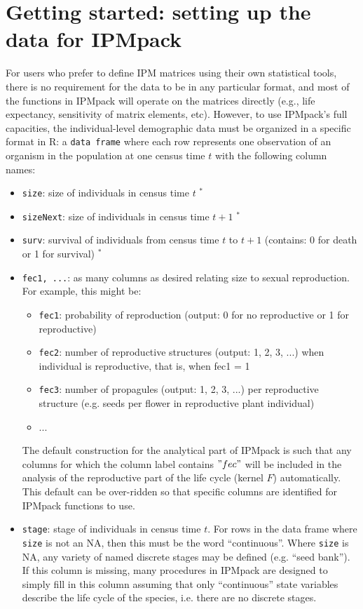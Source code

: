 \documentclass{article}
\begin{document}
\section{Getting started: setting up the data for IPMpack}
For users who prefer to define IPM matrices using their own
statistical tools, there is no requirement for the data to be in any
particular format, and most of the functions in IPMpack will operate
on the matrices directly (e.g., life expectancy, sensitivity of matrix
elements, etc).  However, to use IPMpack's full capacities, the
individual-level demographic data must be organized in a specific
format in R: a {\tt data frame} where each row represents one observation of an organism in the population at one census time $t$ with the following column names:  
\begin{itemize}
\item  {\tt size}: size of individuals in census time $t$  $^*$
\item  {\tt sizeNext}: size of individuals in census time $t+1$  $^*$
\item  {\tt surv}: survival of individuals from census time $t$ to  $t+1$ (contains: 0 for death or 1 for survival) $^*$
\item  {\tt fec1, ...}: as many columns as desired relating size to sexual reproduction. For example, this might be: 
  \begin{itemize}
  \item {\tt fec1}: probability of reproduction (output: 0 for no reproductive or 1 for reproductive)
  \item {\tt fec2}: number of reproductive structures (output: 1, 2, 3, $...$) when individual is reproductive, that is, when fec1 = 1
  \item {\tt fec3}: number of propagules (output: 1, 2, 3, $...$) per reproductive structure (e.g. seeds per flower in reproductive plant individual)
  \item ...
  \end{itemize}
  The default construction for the analytical part of IPMpack is such that any columns for which the column label contains $"fec"$ will be included in the analysis of the reproductive part of the life cycle (kernel $F$) automatically. This default can be over-ridden so that specific columns are identified for IPMpack functions to use.   
\item  {\tt stage}: stage of individuals in census time $t$. For rows in the  data frame where {\tt size} is not an NA, then this must be the word ``continuous''. Where {\tt size} is NA, any variety of named discrete stages  may be defined (e.g. ``seed bank''). If this column is missing, many procedures in IPMpack are designed to simply fill in this column assuming that only ``continuous'' state variables describe the life cycle of the species, i.e. there are no discrete stages. 

\end{itemize}
\end{document}
